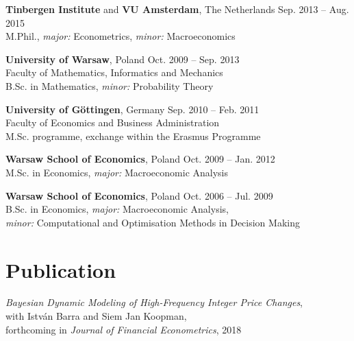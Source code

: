 \documentclass[margin,line]{resume}
\begin{document}
\begin{resume}
\vspace{-1mm}

    \textbf{Tinbergen Institute} and \textbf{VU Amsterdam}, The Netherlands  \hfill Sep. 2013 -- Aug. 2015 	\\
	M.Phil., \textit{major:} Econometrics, \textit{minor:} Macroeconomics 

\vspace{-1mm}

	\textbf{University of Warsaw}, Poland  \hfill Oct. 2009 -- Sep. 2013 	
	\vspace{1mm}\\
	Faculty of Mathematics, Informatics and Mechanics \\B.Sc. in Mathematics, \textit{minor:} Probability Theory 
    
\vspace{-1mm}

	\textbf{University of G{\"o}ttingen}, Germany   \hfill Sep. 2010 -- Feb. 2011	\\
    Faculty of Economics and Business Administration \\M.Sc. programme, exchange within the Erasmus Programme

\vspace{-1mm}

	\textbf{Warsaw School of Economics}, Poland   \hfill Oct. 2009 -- Jan. 2012\\
	M.Sc. in Economics, \textit{major:} Macroeconomic Analysis

\vspace{-1mm}

 	\textbf{Warsaw School of Economics}, Poland  \hfill Oct. 2006 --  Jul. 2009\\
   	B.Sc. in Economics, \textit{major:} Macroeconomic Analysis,\\ 
    \textit{minor:} Computational and Optimisation Methods in Decision Making\\
    
\vspace{-4mm}
\section{\mysidestyle Publication}
	\textit{Bayesian Dynamic Modeling of High-Frequency Integer Price Changes},\\
	with Istv\'{a}n Barra  and Siem Jan Koopman,\\
	forthcoming in \textit{Journal of Financial Econometrics}, 2018  \vspace{-5mm} \\ 
	

\end{resume}
\end{document}
